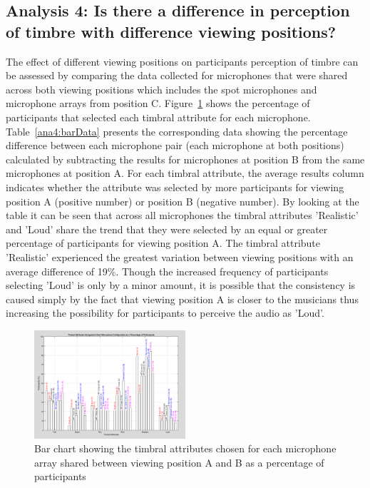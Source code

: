 















\subsection{Analysis 4: Is there a difference in perception of timbre with difference viewing positions?}
\label{ana4}
		
	The effect of different viewing positions on participants perception of timbre can be assessed by comparing the data collected for microphones that were shared across both viewing positions which includes the spot microphones and microphone arrays from position C. Figure~\ref{image:ta_sharedmics} shows the percentage of participants that selected each timbral attribute for each microphone. Table~\ref{ana4:barData} presents the corresponding data showing the percentage difference between each microphone pair (each microphone at both positions) calculated by subtracting the results for microphones at position B from the same microphones at position A. For each timbral attribute, the average results column indicates whether the attribute was selected by more participants for viewing position A (positive number) or position B (negative number). By looking at the table it can be seen that across all microphones the timbral attributes 'Realistic' and 'Loud' share the trend that they were selected by an equal or greater percentage of participants for viewing position A. The timbral attribute 'Realistic' experienced the greatest variation between viewing positions with an average difference of 19\%. Though the increased frequency of participants selecting 'Loud' is only by a minor amount, it is possible that the consistency is caused simply by the fact that viewing position A is closer to the musicians thus increasing the possibility for participants to perceive the audio as 'Loud'. \\

	\begin{figure}
		\includegraphics[width=0.5\textwidth]{images/plots/bar_sharedMics.PNG}
		\caption{Bar chart showing the timbral attributes chosen for each microphone array shared between viewing position A and B as a percentage of participants}
		\label{image:ta_sharedmics} 
	\end{figure}	

